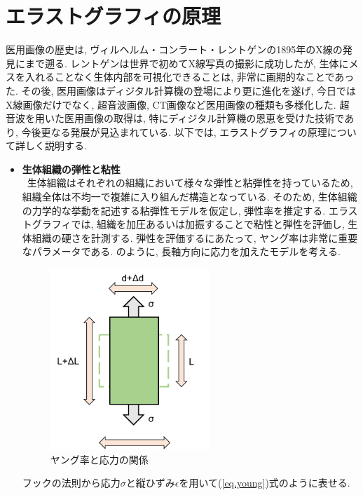 \section{エラストグラフィの原理}
医用画像の歴史は, ヴィルヘルム・コンラート・レントゲンの1895年のX線の発見にまで遡る. レントゲンは世界で初めてX線写真の撮影に成功したが,  生体にメスを入れることなく生体内部を可視化できることは, 非常に画期的なことであった. その後, 医用画像はディジタル計算機の登場により更に進化を遂げ, 今日ではX線画像だけでなく, 超音波画像, CT画像など医用画像の種類も多様化した. 超音波を用いた医用画像の取得は, 特にディジタル計算機の恩恵を受けた技術であり, 今後更なる発展が見込まれている. 以下では, エラストグラフィの原理について詳しく説明する. %
\begin{itemize}
\item{\bf 生体組織の弾性と粘性}\cite{elastography}
\\\ 生体組織はそれぞれの組織において様々な弾性と粘弾性を持っているため, 組織全体は不均一で複雑に入り組んだ構造となっている. そのため, 生体組織の力学的な挙動を記述する粘弾性モデルを仮定し, 弾性率を推定する.%
エラストグラフィでは, 組織を加圧あるいは加振することで粘性と弾性を評価し, 生体組織の硬さを計測する. 弾性を評価するにあたって, ヤング率は非常に重要なパラメータである. のように, 長軸方向に応力を加えたモデルを考える. 
\begin{figure}[H]
  \begin{center}
    \includegraphics[width=60mm]{fig/young.pdf}
  \end{center}
  \caption{ヤング率と応力の関係}
\end{figure}
フックの法則から応力$\sigma$と縦ひずみ$\epsilon$を用いて(\ref{eq.young})式のように表せる. 
\begin{equation}

\end{equation}
\end{itemize}

